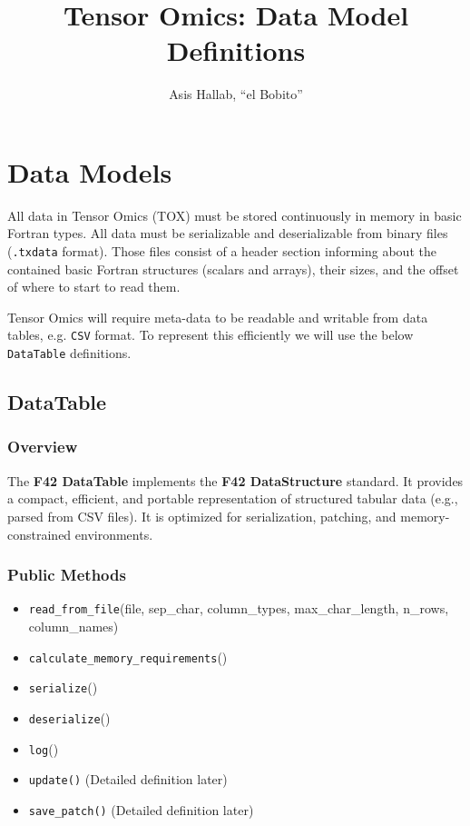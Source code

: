 \documentclass{article}
\title{Tensor Omics: Data Model Definitions}
\author{Asis Hallab, ``el Bobito''}
\begin{document}
\maketitle

\section{Data Models}


All data in Tensor Omics (TOX) must be stored continuously in memory in basic
Fortran types. All data must be serializable and deserializable from binary
files (\texttt{.txdata} format). Those files consist of a header section
informing about the contained basic Fortran structures (scalars and arrays),
their sizes, and the offset of where to start to read them.

Tensor Omics will require meta-data to be readable and writable from data
tables, e.g. \texttt{CSV} format. To represent this efficiently we will use the
below \texttt{DataTable} definitions.

\subsection{DataTable}

\subsubsection{Overview}

The \textbf{F42 DataTable} implements the \textbf{F42 DataStructure} standard.
It provides a compact, efficient, and portable representation of structured tabular data (e.g., parsed from CSV files).
It is optimized for serialization, patching, and memory-constrained environments.

\subsubsection{Public Methods}

\begin{itemize}
    \item \texttt{read\_from\_file}(file, sep\_char, column\_types, max\_char\_length, n\_rows, column\_names)
    \item \texttt{calculate\_memory\_requirements}()
    \item \texttt{serialize}()
    \item \texttt{deserialize}()
    \item \texttt{log}()
    \item \texttt{update()} \hfill (Detailed definition later)
    \item \texttt{save\_patch()} \hfill (Detailed definition later)
\end{itemize}
\end{document}
